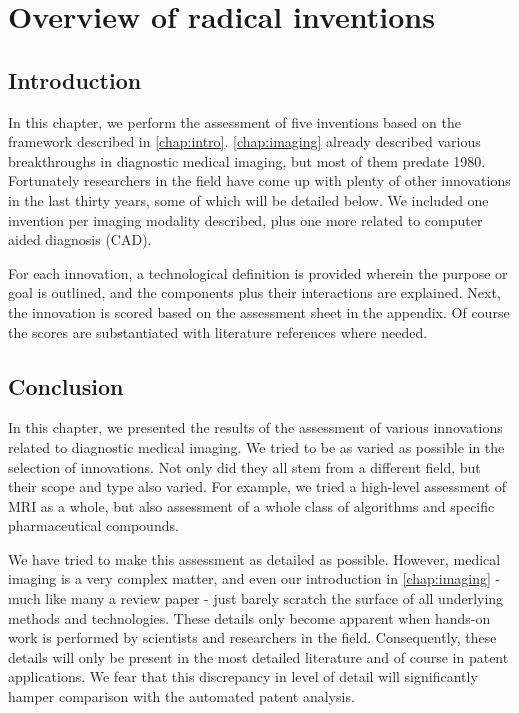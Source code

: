 \chapter{Overview of radical inventions}\label{chap:inventions}

\section{Introduction} %
In this chapter, we perform the assessment of five inventions based on the
framework described in \autoref{chap:intro}. \autoref{chap:imaging} already
described various breakthroughs in diagnostic medical imaging, but most of them
predate 1980. Fortunately researchers in the field have come up with plenty of
other innovations in the last thirty years, some of which will be detailed
below. We included one invention per imaging modality described, plus one more
related to computer aided diagnosis (CAD).

For each innovation, a technological definition is provided wherein the purpose
or goal is outlined, and the components plus their interactions are explained.
Next, the innovation is scored based on the assessment sheet in the appendix. Of
course the scores are substantiated with literature references where needed.











\section{Conclusion}
In this chapter, we presented the results of the assessment of various
innovations related to diagnostic medical imaging. We tried to be as varied as
possible in the selection of innovations. Not only did they all stem from a
different field, but their scope and type also varied. For example, we tried a
high-level assessment of MRI as a whole, but also assessment of a whole class of
algorithms and specific pharmaceutical compounds.

We have tried to make this assessment as detailed as possible. However, medical
imaging is a very complex matter, and even our introduction in
\autoref{chap:imaging} - much like many a review paper - just barely scratch the
surface of all underlying methods and technologies. These details only become
apparent when hands-on work is performed by scientists and researchers in the
field. Consequently, these details will only be present in the most detailed
literature and of course in patent applications. We fear that this discrepancy
in level of detail will significantly hamper comparison with the automated
patent analysis.

